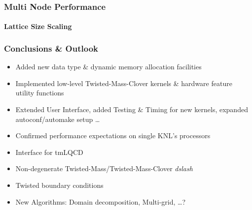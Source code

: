 \documentclass{beamer}
\begin{document}
  \begin{frame}
      \frametitle{Multi Node Performance}
      \framesubtitle{Lattice Size Scaling}

      \centering
  \end{frame}


  \begin{frame}
    \frametitle{Conclusions \& Outlook}

    \begin{itemize}
      \item Added new data type \& dynamic memory allocation facilities
      \item Implemented low-level Twisted-Mass-Clover kernels \& hardware feature utility functions
      \item Extended User Interface, added Testing \& Timing for new kernels,
        expanded autoconf/automake setup \dots
      \item Confirmed performance expectations on single KNL's processors
        \vspace{5mm}
        \pause
      \item Interface for tmLQCD
      \item Non-degenerate Twisted-Mass/Twisted-Mass-Clover \textit{dslash}
      \item Twisted boundary conditions
      \item New Algorithms: Domain decomposition, Multi-grid, \dots ?
        \vfill
    \end{itemize}

  \end{frame}


  \begin{frame}
    \titlepage
  \end{frame}

  
\end{document}

